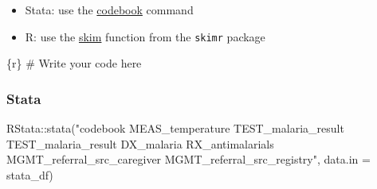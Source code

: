 \documentclass[
  letterpaper,
  DIV=11,
  numbers=noendperiod,
  oneside]{scrreprt}
\newenvironment{Shaded}{\begin{snugshade}}{\end{snugshade}}
\newcommand{\AttributeTok}[1]{\textcolor[rgb]{0.40,0.45,0.13}{#1}}
\newcommand{\CommentTok}[1]{\textcolor[rgb]{0.37,0.37,0.37}{#1}}
\newcommand{\FunctionTok}[1]{\textcolor[rgb]{0.28,0.35,0.67}{#1}}
\newcommand{\InformationTok}[1]{\textcolor[rgb]{0.37,0.37,0.37}{#1}}
\newcommand{\NormalTok}[1]{\textcolor[rgb]{0.00,0.23,0.31}{#1}}
\newcommand{\SpecialCharTok}[1]{\textcolor[rgb]{0.37,0.37,0.37}{#1}}
\newcommand{\StringTok}[1]{\textcolor[rgb]{0.13,0.47,0.30}{#1}}
\providecommand{\tightlist}{%
  \setlength{\itemsep}{0pt}\setlength{\parskip}{0pt}}\usepackage{longtable,booktabs,array}
\begin{document}
\begin{tcolorbox}[enhanced jigsaw, coltitle=black, opacityback=0, title=\textcolor{quarto-callout-tip-color}{\faLightbulb}\hspace{0.5em}{Tip}, toprule=.15mm, bottomtitle=1mm, colbacktitle=quarto-callout-tip-color!10!white, colframe=quarto-callout-tip-color-frame, left=2mm, opacitybacktitle=0.6, bottomrule=.15mm, arc=.35mm, toptitle=1mm, colback=white, titlerule=0mm, breakable, leftrule=.75mm, rightrule=.15mm]

\begin{itemize}
\tightlist
\item
  Stata: use the
  \href{https://www.stata.com/manuals/dcodebook.pdf}{codebook} command
\item
  R: use the
  \href{https://docs.ropensci.org/skimr/reference/skim.html}{skim}
  function from the \texttt{skimr} package
\end{itemize}

\end{tcolorbox}

\begin{Shaded}
\begin{Highlighting}[]
\InformationTok{\textasciigrave{}\textasciigrave{}\textasciigrave{}\{r\}}
\CommentTok{\# Write your code here}
\InformationTok{\textasciigrave{}\textasciigrave{}\textasciigrave{}}
\end{Highlighting}
\end{Shaded}

\subsubsection{Stata}

\begin{Shaded}
\begin{Highlighting}[]
\NormalTok{RStata}\SpecialCharTok{::}\FunctionTok{stata}\NormalTok{(}\StringTok{"codebook MEAS\_temperature TEST\_malaria\_result TEST\_malaria\_result DX\_malaria RX\_antimalarials MGMT\_referral\_src\_caregiver MGMT\_referral\_src\_registry"}\NormalTok{,}
              \AttributeTok{data.in =}\NormalTok{ stata\_df)}
\end{Highlighting}
\end{Shaded}
\end{document}
